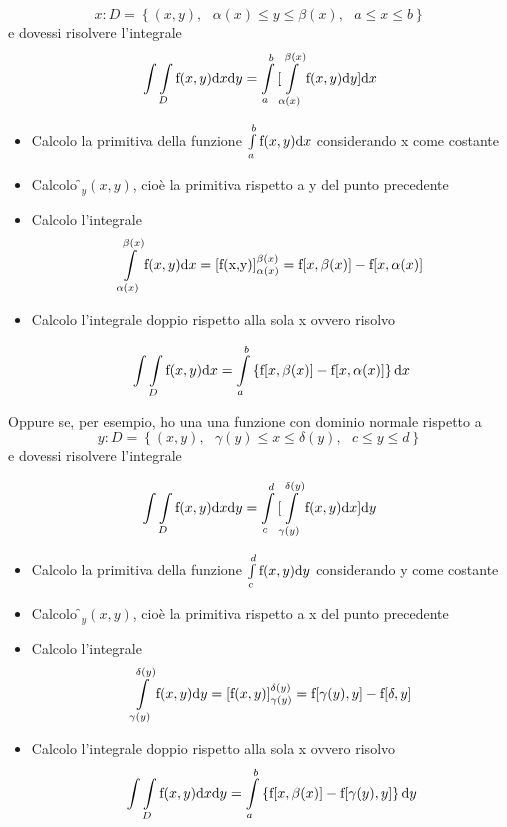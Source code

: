 \[
x:D=\left\{{(x,y),\text{ }\alpha(x)\leq y\leq \beta(x),\text{ }a\leq x \leq b}\right\}
\]
e dovessi risolvere l'integrale
\[
\int\limits{\int\limits_D{\text{\text{f}}(x,y){\rm d}x{\rm d}y}}=\int\limits_a^b{[\int\limits_{\alpha(x)}^{\beta(x)}{\text{\text{f}}(x,y){\rm d}y}]}{\rm d}x
\]

\begin{itemize}
    \item{Calcolo la primitiva della funzione $\int\limits_a^b{\text{f}(x,y){\rm d}x}$ considerando x come costante}
    \item{Calcolo \f$_y(x,y)$, cioè la primitiva rispetto a y del punto precedente}
    \item{Calcolo l'integrale
    \[
     \int\limits_{\alpha(x)}^{\beta(x)}{\text{\text{f}}(x,y){\rm d}x}=[\text{\text{f}(x,y)}]_{\alpha(x)}^{\beta(x)}=\text{\text{f}}[x,\beta(x)]-\text{\text{f}}[x,\alpha(x)]
     \]
     }
    \item{Calcolo l'integrale doppio rispetto alla sola x ovvero risolvo
    
    \[
    \int\limits\int\limits_D{\text{\text{f}}(x,y){\rm d}x}=\int\limits_a^b\left\{{{\text{\text{f}}[x,\beta(x)]-\text{\text{f}}[x,\alpha(x)]}}\right\}{\rm d}x
    \]
    }
\end{itemize}

Oppure se, per esempio, ho una una funzione con dominio normale rispetto a 
\[
y:D=\left\{{(x,y),\text{ }\gamma(y)\leq x\leq \delta(y),\text{ }c\leq y \leq d}\right\}
\]
e dovessi risolvere l'integrale

\[
\int\limits{\int\limits_D{\text{\text{f}}(x,y){\rm d}x{\rm d}y}}=\int\limits_c^d{[\int\limits_{\gamma(y)}^{\delta(y)}{\text{\text{f}}(x,y){\rm d}x}]}{\rm d}y
\]

\begin{itemize}
    \item{Calcolo la primitiva della funzione $\int\limits_c^d{\text{\text{f}}(x,y){\rm d}y}$ considerando y come costante}
    \item{Calcolo \f$_y(x,y)$, cioè la primitiva rispetto a x del punto precedente}
    \item{Calcolo l'integrale
    \[
     \int\limits_{\gamma(y)}^{\delta(y)}{\text{f}(x,y){\rm d}y}=[\text{f}(x,y)]_{\gamma(y)}^{\delta(y)}=\text{f}[\gamma(y),y]- \text{f}[\delta, y]
     \]
     }
     
    \item{Calcolo l'integrale doppio rispetto alla sola x ovvero risolvo
    \[
     \int\limits\int\limits_D{\text{\text{f}}(x,y){\rm d}x}{{\rm d}y}=\int\limits_a^b\left\{{{\text{\text{f}}[x,\beta(x)]-\text{\text{f}}[\gamma(y),y]}}\right\}{\rm d}y
     \]}
\end{itemize}